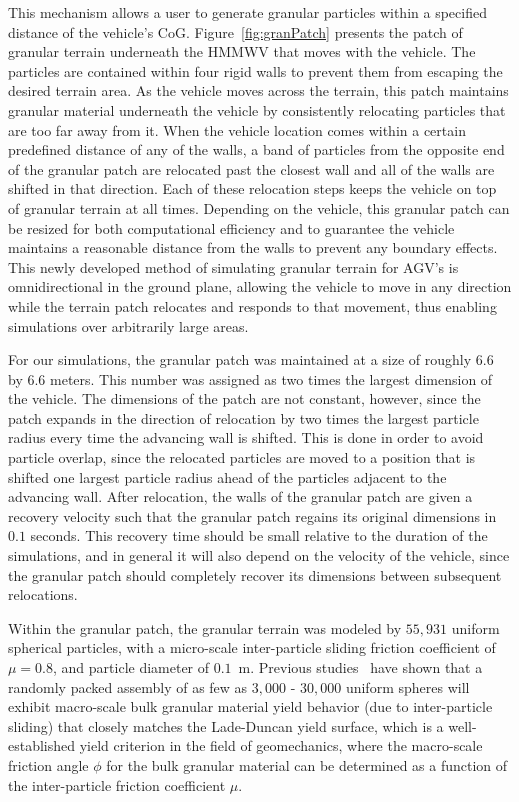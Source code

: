 \documentclass[12pt,onecolumn]{report}
\newcommand{\CHRONO}{{\sffamily{{Chrono}}}}
\begin{document}
This mechanism allows a user to generate granular particles within a specified distance of the vehicle's CoG. Figure~\ref{fig:granPatch} presents the patch of granular terrain underneath the {\CHRONO}  HMMWV that moves with the vehicle. The particles are contained within four rigid walls to prevent them from escaping the desired terrain area. As the vehicle moves across the terrain, this patch maintains granular material underneath the vehicle by consistently relocating particles that are too far away from it. When the vehicle location comes within a certain predefined distance of any of the walls, a band of particles from the opposite end of the granular patch are relocated past the closest wall and all of the walls are shifted in that direction. Each of these relocation steps keeps the vehicle on top of granular terrain at all times. Depending on the vehicle, this granular patch can be resized for both computational efficiency and to guarantee the vehicle maintains a reasonable distance from the walls to prevent any boundary effects. This newly developed method of simulating granular terrain for AGV's is omnidirectional in the ground plane, allowing the vehicle to move in any direction while the terrain patch relocates and responds to that movement, thus enabling simulations over arbitrarily large areas.

For our simulations, the granular patch was maintained at a size of roughly $6.6$ by $6.6$ meters.  This number was assigned as two times the largest dimension of the vehicle.  The dimensions of the patch are not constant, however, since the patch expands in the direction of relocation by two times the largest particle radius every time the advancing wall is shifted.  This is done in order to avoid particle overlap, since the relocated particles are moved to a position that is shifted one largest particle radius ahead of the particles adjacent to the advancing wall.  After relocation, the walls of the granular patch are given a recovery velocity such that the granular patch regains its original dimensions in $0.1$ seconds.  This recovery time should be small relative to the duration of the simulations, and in general it will also depend on the velocity of the vehicle, since the granular patch should completely recover its dimensions between subsequent relocations.

Within the granular patch, the granular terrain was modeled by $55,931$ uniform spherical particles, with a micro-scale inter-particle sliding friction coefficient of $\mu = 0.8$, and particle diameter of $0.1$~m.  Previous studies~\cite{fleischmannetalGEGE2014} have shown that 
a randomly packed assembly of as few as $3,000$ - $30,000$ uniform spheres will exhibit macro-scale bulk granular material yield behavior (due to inter-particle sliding) that closely matches the Lade-Duncan yield surface, which is a well-established yield criterion in the field of geomechanics, where the macro-scale friction angle $\phi$ for the bulk granular material can be determined as a function of the inter-particle friction coefficient $\mu$.
\end{document}
